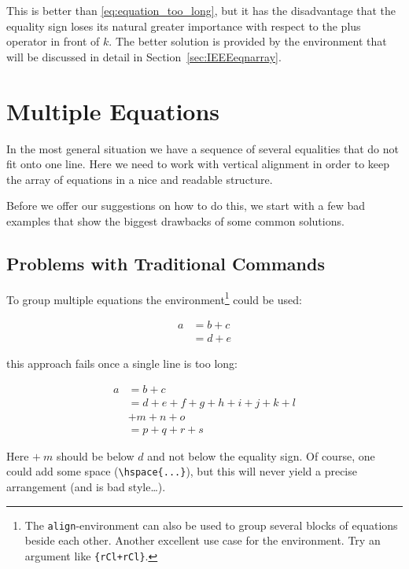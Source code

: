 This is better than \eqref{eq:equation_too_long}, but
it has the disadvantage that the equality sign loses its natural
greater importance with respect to the plus operator in front of
$k$. The better solution is provided by the
 environment that will be discussed in detail in
Section~\ref{sec:IEEEeqnarray}.

\section{Multiple Equations}
\label{sec:IEEEeqnarray}

In the most general situation we have a sequence of several
equalities that do not fit onto one line. Here we need to work with
vertical alignment in order to keep the array of equations in a nice
and readable structure.

Before we offer our suggestions on how to do this, we start with a few
bad examples that show the biggest drawbacks of some common solutions.


\subsection{Problems with Traditional Commands}
\label{sec:problems_traditional}

To group multiple equations the
 environment\footnote{The \texttt{align}-environment can
  also be used to group several blocks of equations beside each other.
  Another excellent use case for the
   environment. Try an argument like
  \texttt{\{rCl+rCl\}}.} could be used:
\begin{example}
\begin{align}
  a & = b + c \\
  & = d + e
\end{align}
\end{example}

this approach fails once a single line is too long:
\begin{example}
\begin{align}
  a & = b + c \\
  & = d + e + f + g + h + i 
  + j + k + l \nonumber \\
  & + m + n + o \\
  & = p + q + r + s
\end{align}
\end{example}
\noindent
Here $+\:m$ should be below $d$ and not below the equality sign. Of
course, one could add some space (\verb+\hspace{...}+),
but this will never yield a precise arrangement (and is bad
style\ldots).

